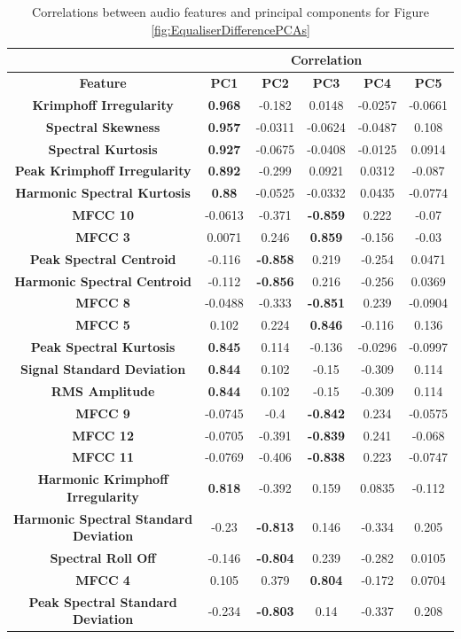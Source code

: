 		\begin{table}
			\centering
			\begin{tabular}{|c|c|c|c|c|c|}
				\cline{2-6}
				\multicolumn{1}{c|}{} & \multicolumn{5}{c|}{\bf{Correlation}} \tabularnewline
				\hline
				\bf{Feature} & \bf{PC1} & \bf{PC2} & \bf{PC3} & \bf{PC4} & \bf{PC5} \tabularnewline
				\hline
				\hline
				\bf{Krimphoff Irregularity} & \bf{0.968} & -0.182 & 0.0148 & -0.0257 & -0.0661 \tabularnewline
				\hline
				\bf{Spectral Skewness} & \bf{0.957} & -0.0311 & -0.0624 & -0.0487 & 0.108 \tabularnewline
				\hline
				\bf{Spectral Kurtosis} & \bf{0.927} & -0.0675 & -0.0408 & -0.0125 & 0.0914 \tabularnewline
				\hline
				\bf{Peak Krimphoff Irregularity} & \bf{0.892} & -0.299 & 0.0921 & 0.0312 & -0.087 \tabularnewline
				\hline
				\bf{Harmonic Spectral Kurtosis} & \bf{0.88} & -0.0525 & -0.0332 & 0.0435 & -0.0774 \tabularnewline
				\hline
				\bf{MFCC 10} & -0.0613 & -0.371 & \bf{-0.859} & 0.222 & -0.07 \tabularnewline
				\hline
				\bf{MFCC 3} & 0.0071 & 0.246 & \bf{0.859} & -0.156 & -0.03 \tabularnewline
				\hline
				\bf{Peak Spectral Centroid} & -0.116 & \bf{-0.858} & 0.219 & -0.254 & 0.0471 \tabularnewline
				\hline
				\bf{Harmonic Spectral Centroid} & -0.112 & \bf{-0.856} & 0.216 & -0.256 & 0.0369 \tabularnewline
				\hline
				\bf{MFCC 8} & -0.0488 & -0.333 & \bf{-0.851} & 0.239 & -0.0904 \tabularnewline
				\hline
				\bf{MFCC 5} & 0.102 & 0.224 & \bf{0.846} & -0.116 & 0.136 \tabularnewline
				\hline
				\bf{Peak Spectral Kurtosis} & \bf{0.845} & 0.114 & -0.136 & -0.0296 & -0.0997 \tabularnewline
				\hline
				\bf{Signal Standard Deviation} & \bf{0.844} & 0.102 & -0.15 & -0.309 & 0.114 \tabularnewline
				\hline
				\bf{RMS Amplitude} & \bf{0.844} & 0.102 & -0.15 & -0.309 & 0.114 \tabularnewline
				\hline
				\bf{MFCC 9} & -0.0745 & -0.4 & \bf{-0.842} & 0.234 & -0.0575 \tabularnewline
				\hline
				\bf{MFCC 12} & -0.0705 & -0.391 & \bf{-0.839} & 0.241 & -0.068 \tabularnewline
				\hline
				\bf{MFCC 11} & -0.0769 & -0.406 & \bf{-0.838} & 0.223 & -0.0747 \tabularnewline
				\hline
				\bf{Harmonic Krimphoff Irregularity} & \bf{0.818} & -0.392 & 0.159 & 0.0835 & -0.112 \tabularnewline
				\hline
				\bf{Harmonic Spectral Standard Deviation} & -0.23 & \bf{-0.813} & 0.146 & -0.334 & 0.205 \tabularnewline
				\hline
				\bf{Spectral Roll Off} & -0.146 & \bf{-0.804} & 0.239 & -0.282 & 0.0105 \tabularnewline
				\hline
				\bf{MFCC 4} & 0.105 & 0.379 & \bf{0.804} & -0.172 & 0.0704 \tabularnewline
				\hline
				\bf{Peak Spectral Standard Deviation} & -0.234 & \bf{-0.803} & 0.14 & -0.337 & 0.208 \tabularnewline
				\hline
			\end{tabular}
			\caption{Correlations between audio features and principal components for Figure
				 \ref{fig:EqualiserDifferencePCAs}}
			\label{fig:EqualiserDifferenceCorrelations}
		\end{table}
